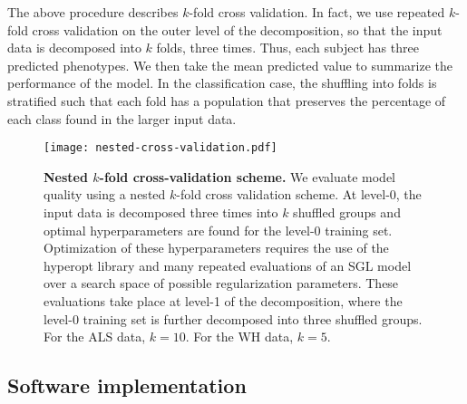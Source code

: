 The above procedure describes $k$-fold cross validation. In fact, we use
repeated $k$-fold cross validation on the outer level of the decomposition, so
that the input data is decomposed into $k$ folds, three times. Thus, each
subject has three predicted phenotypes. We then take the mean predicted value to
summarize the performance of the model. In the classification case, the
shuffling into folds is stratified such that each fold has a population that
preserves the percentage of each class found in the larger input data.

\begin{figure}[!h]
    \centering
    \texttt{[image: nested-cross-validation.pdf]}
    \caption{{\bf Nested $k$-fold cross-validation scheme.}
        We evaluate model quality using a nested $k$-fold cross
        validation scheme. At level-0, the input data is decomposed
        three times into $k$ shuffled groups and optimal hyperparameters
        are found for the level-0 training set. Optimization of these
        hyperparameters requires the use of the hyperopt library and
        many repeated evaluations of an SGL model over a search space
        of possible regularization parameters. These evaluations take
        place at level-1 of the decomposition, where the level-0 training
        set is further decomposed into three shuffled groups.
        For the ALS data, $k=10$. For the WH data, $k=5$.
    }
    \label{fig:cross-val}
\end{figure}

\subsection*{Software implementation}

